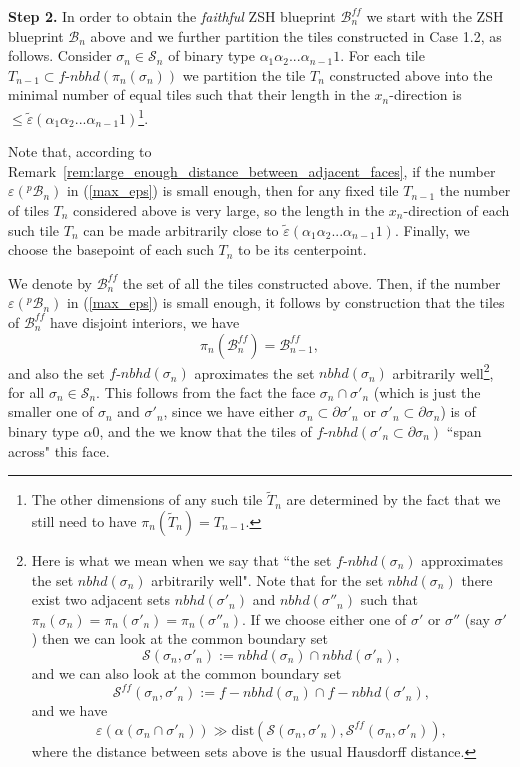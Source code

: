 \documentclass[12pt,letterpaper]{article}
\renewcommand{\S}{\mathcal{S}}
\renewcommand{\SS}{\mathscr{S}}
\newcommand{\B}{\mathcal{B}}
\newcommand{\eps}{\varepsilon}
\newcommand{\dist}{\mathrm{dist}}
\newcommand{\et}{\tilde\eps}
\newcommand{\nbhd}{\mathit{nbhd}}
\renewcommand{\a}{\alpha}
\begin{document}
\bigskip


\bigskip



\noindent
{\bf Step 2.} 
%
In order to obtain the {\em faithful} ZSH blueprint $\B_n^\mathit{ff}$ we start with the ZSH blueprint $\B_n$ above and we further partition the tiles constructed in Case 1.2, as follows.
Consider  $\sigma_n \in \S_n$ of binary type $\a_1\a_2...\a_{n-1}1$. 
For each tile $T_{n-1} \subset f\text{-}\nbhd(\pi_n(\sigma_n))$ we partition the tile $T_n$ constructed above 
into the minimal number of equal tiles such that their length in the $x_n$-direction  is $\le \et(\a_1\a_2...\a_{n-1}1)$\footnote{The other dimensions of any such tile $\tilde T_n$ are determined by the fact that we still need to have $\pi_n(\tilde T_n) = T_{n-1}$.}.


Note that, according to Remark~\ref{rem:large_enough_distance_between_adjacent_faces}, if the number $\eps(^p\!\B_n)$ in (\ref{max_eps}) is small enough, then for any fixed tile $T_{n-1}$ the number of tiles $T_n$ considered above is very large, so the length in the $x_n$-direction of each such tile $T_n$ can be made arbitrarily close to $\et(\a_1\a_2...\a_{n-1}1)$.
Finally, we choose the basepoint of each such $T_n$ to be its centerpoint. 



\bigskip



We denote by $\B_n^\mathit{ff}$ the set of all the tiles constructed above. Then, if the number $\eps(^p\!\B_n)$ in (\ref{max_eps}) is small enough, it follows by construction that the tiles of $\B_n^\mathit{ff}$ have disjoint interiors, we have
$$
\pi_n(\B_n^\mathit{ff}) = \B_{n-1}^\mathit{ff},
$$
and also the set $f$-$\nbhd(\sigma_n)$ aproximates the set $\nbhd(\sigma_n)$ arbitrarily well\footnote{
%
%
%
%
Here is what we mean when we say that ``the set $f$-$\nbhd(\sigma_n)$ approximates the set $\nbhd(\sigma_n)$ arbitrarily well". Note that for the set $\nbhd(\sigma_n)$ there exist two adjacent sets $\nbhd(\sigma'_n)$ and $\nbhd(\sigma''_n)$ such that $\pi_n(\sigma_n) = \pi_n(\sigma'_n) = \pi_n(\sigma''_n)$. If we choose either one of $\sigma'$ or $\sigma''$ (say $\sigma'$) then we can look at the common boundary set 
$$
\SS(\sigma_n, \sigma'_n) := \nbhd(\sigma_n) \cap \nbhd(\sigma'_n), 
$$
and we can also  look at the common boundary set 
$$
\SS^\mathit{ff}(\sigma_n, \sigma'_n) := f-\nbhd(\sigma_n) \cap f-\nbhd(\sigma'_n),
$$
and we  have 
$$
\eps(\a(\sigma_n \cap \sigma'_n)) \gg \dist(\SS(\sigma_n, \sigma'_n), \SS^\mathit{ff}(\sigma_n, \sigma'_n)),
$$
where the distance between sets above  is the usual Hausdorff distance.
%
%
%
%
}, for all $\sigma_n \in \S_n$. This follows from the fact the face $\sigma_n \cap \sigma'_n$ (which is just the smaller one of $\sigma_n$ and $\sigma'_n$, since we have either $\sigma_n \subset \partial \sigma'_n$ or $\sigma'_n \subset \partial \sigma_n$) is of binary type $\a 0$, and  the we know that the tiles of $f$-$\nbhd(\sigma'_n \subset \partial \sigma_n)$ ``span across" this face. 
\end{document}

